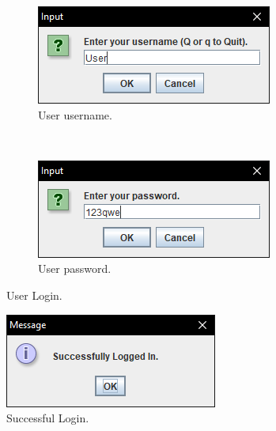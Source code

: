 \documentclass[12pt,twocolumn]{IEEEtran}
\begin{document}
\begin{figure}[h!]
	\centering
	\begin{subfigure}[t]{0.5\textwidth}
		\centering
		\includegraphics[width=0.8\linewidth]{./Resources/userUser.PNG}
		\caption{User username.}
	\end{subfigure}%
	~ 
	\begin{subfigure}[t]{0.5\textwidth}
		\centering
		\includegraphics[width=0.8\linewidth]{./Resources/userPasswd.PNG}
		\caption{User password.}
	\end{subfigure}
	\caption{User Login.} \label{fig:userCreds}
\end{figure}

\begin{figure}[h!]
	\centering
	\includegraphics[width=0.4\linewidth]{./Resources/loginSuccess.PNG}
	\caption{Successful Login.} \label{fig:loginSuccess}
\end{figure}
\end{document}
